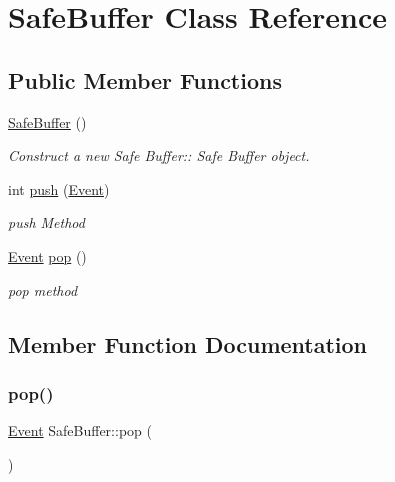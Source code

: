 \hypertarget{classSafeBuffer}{}\section{Safe\+Buffer Class Reference}
\label{classSafeBuffer}
\subsection*{Public Member Functions}
\begin{DoxyCompactItemize}
\item 
\mbox{\label{classSafeBuffer_af835d8d08c4dcd3326f21ae2e9988699}} 
\hyperlink{classSafeBuffer_af835d8d08c4dcd3326f21ae2e9988699}{Safe\+Buffer} ()
\begin{DoxyCompactList}\small\item\em Construct a new Safe Buffer\+:\+: Safe Buffer object. \end{DoxyCompactList}\item 
int \hyperlink{classSafeBuffer_ac3ed0799ec2e84c97e36b22c83f7abf5}{push} (\hyperlink{classEvent}{Event})
\begin{DoxyCompactList}\small\item\em push Method \end{DoxyCompactList}\item 
\hyperlink{classEvent}{Event} \hyperlink{classSafeBuffer_a90a33fca4d838f7c0eef6e8557f3c281}{pop} ()
\begin{DoxyCompactList}\small\item\em pop method \end{DoxyCompactList}\end{DoxyCompactItemize}


\subsection{Member Function Documentation}
\mbox{\label{classSafeBuffer_a90a33fca4d838f7c0eef6e8557f3c281}} 
\subsubsection{\texorpdfstring{pop()}{pop()}}
{\footnotesize\ttfamily \hyperlink{classEvent}{Event} Safe\+Buffer\+::pop (\begin{DoxyParamCaption}{ }\end{DoxyParamCaption})}




